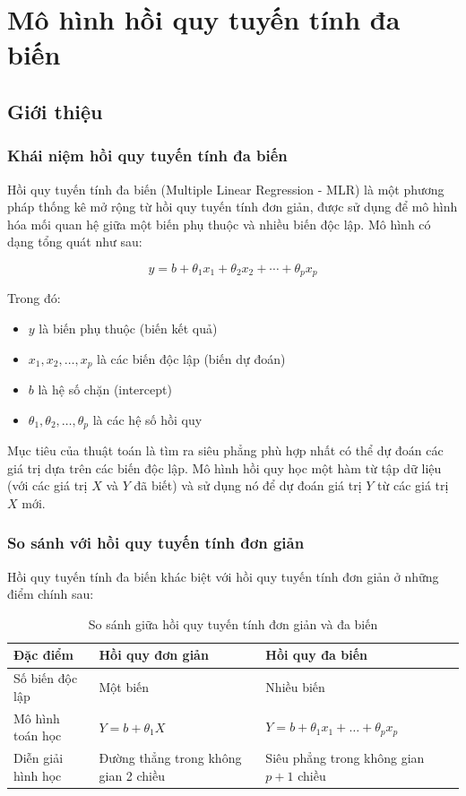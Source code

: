 \newpage
\section{Mô hình hồi quy tuyến tính đa biến}

\subsection{Giới thiệu}

\subsubsection{Khái niệm hồi quy tuyến tính đa biến}

Hồi quy tuyến tính đa biến \cite{geeksforgeeks-ml} (Multiple Linear Regression - MLR) là một phương pháp thống kê mở rộng từ hồi quy tuyến tính đơn giản, được sử dụng để mô hình hóa mối quan hệ giữa một biến phụ thuộc và nhiều biến độc lập. Mô hình có dạng tổng quát như sau:

\[
y = b + \theta_1 x_1 + \theta_2 x_2 + \cdots + \theta_p x_p
\]

Trong đó:
\begin{itemize}
    \item $y$ là biến phụ thuộc (biến kết quả)
    \item $x_1, x_2, \ldots, x_p$ là các biến độc lập (biến dự đoán)
    \item $b$ là hệ số chặn (intercept)
    \item $\theta_1, \theta_2, \ldots, \theta_p$ là các hệ số hồi quy
\end{itemize}

Mục tiêu của thuật toán là tìm ra siêu phẳng phù hợp nhất có thể dự đoán các giá trị dựa trên các biến độc lập. Mô hình hồi quy học một hàm từ tập dữ liệu (với các giá trị $X$ và $Y$ đã biết) và sử dụng nó để dự đoán giá trị $Y$ từ các giá trị $X$ mới.

\subsubsection{So sánh với hồi quy tuyến tính đơn giản}

Hồi quy tuyến tính đa biến khác biệt với hồi quy tuyến tính đơn giản ở những điểm chính sau:

\begin{table}[H]
\centering
\begin{tabular}{|p{5cm}|p{5cm}|p{5cm}|}
\hline
\textbf{Đặc điểm} & \textbf{Hồi quy đơn giản} & \textbf{Hồi quy đa biến} \\
\hline
Số biến độc lập & Một biến & Nhiều biến \\
\hline
Mô hình toán học & $Y = b + \theta_1 X$ & $Y = b + \theta_1 x_1 + \dots + \theta_p x_p$ \\
\hline
Diễn giải hình học & Đường thẳng trong không gian 2 chiều & Siêu phẳng trong không gian $p+1$ chiều \\
\hline
\end{tabular}
\caption{So sánh giữa hồi quy tuyến tính đơn giản và đa biến}
\label{tab:comparison}
\end{table}

